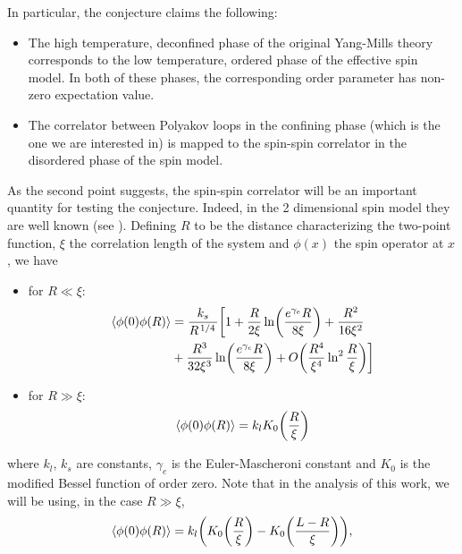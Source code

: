 \documentclass[reqno,12pt]{article}
\numberwithin{equation}{section}
\begin{document}
In particular, the conjecture claims the following:
\begin{itemize}
	\item The high temperature, deconfined phase of the original Yang-Mills theory corresponds to the low temperature, ordered phase of 
	the effective spin model. In both of these phases, the corresponding order parameter has non-zero expectation value.

	\item The correlator between Polyakov loops in the confining phase (which is the one we are interested in) is mapped to the spin-spin
	correlator in the disordered phase of the spin model. 
\end{itemize}

As the second point suggests, the spin-spin correlator will be an important quantity for testing the conjecture. Indeed, in the 2 dimensional
spin model they are well known (see \cite{caristo}). Defining $R$ to be the distance characterizing the two-point function, $\xi$ the
correlation length of the system and $\phi(x)$ the spin operator at $x$, we have
\begin{itemize}
	\item for $R \ll \xi$:
		\begin{equation}
			\begin{aligned}
				\expval{\phi(0) \phi(R)} &= \frac{k_s}{R^{\flatfrac{1}{4}}} \biggl[ 1 + \frac{R}{2\xi} \ln(\frac{e^{\gamma_e}R}{8\xi}) + \frac{R^2}{16\xi^2} \\
				&+ \frac{R^3}{32\xi^3} \ln(\frac{e^{\gamma_e}R}{8\xi}) + O\qty(\frac{R^4}{\xi^4}\ln^2\frac{R}{\xi}) \biggr]
			\end{aligned}
		\end{equation}

	\item for $R \gg \xi$:
		\begin{equation}
			\expval{\phi(0) \phi(R)} = k_l K_0\qty(\frac{R}{\xi})
		\end{equation}
\end{itemize}

where $k_l$, $k_s$ are constants, $\gamma_e$ is the Euler-Mascheroni constant and $K_0$ is the modified Bessel function of order zero. 
Note that in the analysis of this work, we will be using, in the case $R \gg \xi$,
\begin{equation}
	\expval{\phi(0) \phi(R)} = k_l \qty(K_0\qty(\frac{R}{\xi}) - K_0\qty(\frac{L - R}{\xi})),
\end{equation}
\end{document}

